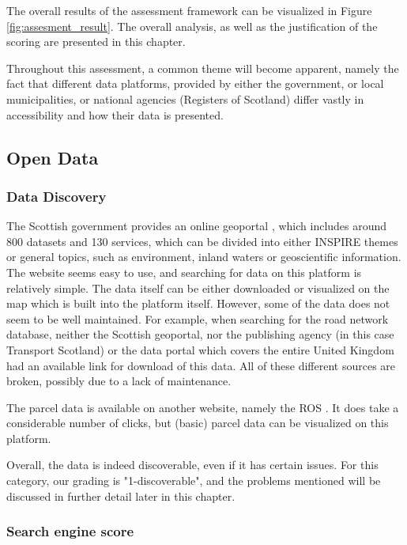 The overall results of the assessment framework can be visualized in Figure \ref{fig:assesment_result}. The overall analysis, as well as the justification of the scoring are presented in this chapter.

Throughout this assessment, a common theme will become apparent, namely the fact that different data platforms, provided by either the government, or local municipalities, or national agencies (Registers of Scotland) differ vastly in accessibility and how their data is presented.

\subsection{Open Data}

\subsubsection{Data Discovery} %

The Scottish government provides an online geoportal \citep{ssdi}, which includes around 800 datasets and 130 services, which can be divided into either INSPIRE themes or general topics, such as environment, inland waters or geoscientific information. The website seems easy to use, and searching for data on this platform is relatively simple. The data itself can be either downloaded or visualized on the map which is built into the platform itself. 
However, some of the data does not seem to be well maintained. For example, when searching for the road network database, neither the Scottish geoportal, nor the publishing agency (in this case Transport Scotland) or the data portal which covers the entire United Kingdom had an available link for download of this data. All of these different sources are broken, possibly due to a lack of maintenance.

The parcel data is available on another website, namely the ROS \citep{ros} . It does take a considerable number of clicks, but (basic) parcel data can be visualized on this platform.

Overall, the data is indeed discoverable, even if it has certain issues. For this category, our grading is "1-discoverable", and the problems mentioned will be discussed in further detail later in this chapter.

\subsubsection{Search engine score}

